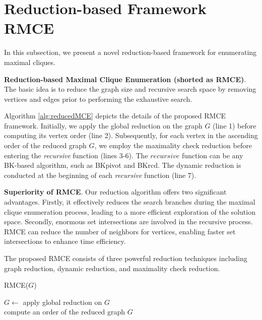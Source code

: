 \documentclass[sigconf, nonacm]{acmart}
\begin{document}
\section{Reduction-based Framework RMCE}\label{framework}

In this subsection, we present a novel reduction-based framework for enumerating maximal cliques. 

\noindent\textbf{Reduction-based Maximal Clique Enumeration (shorted as RMCE)}. The basic idea is to reduce the graph size and recursive search space by removing vertices and edges prior to performing the exhaustive search. 

Algorithm \ref{alg:reducedMCE} depicts the details of the proposed RMCE framework.  
Initially, we apply the global reduction on the graph $G$ (line 1)  before computing its vertex order (line 2). Subsequently, for each vertex in the ascending order of the reduced graph $G$, we employ the maximality check reduction before entering the \textit{recursive} function (lines 3-6). The $recursive$ function can be any BK-based algorithm, such as BKpivot and BKrcd. The dynamic reduction is conducted at the beginning of each \textit{recursive} function (line 7).


\noindent \textbf{Superiority of RMCE}. Our reduction algorithm offers two significant advantages. Firstly, it effectively reduces the search branches during the maximal clique enumeration process, leading to a more efficient exploration of the solution space. Secondly, enormous set intersections are involved in the recursive process. RMCE can reduce the number of neighbors for vertices, enabling faster set intersections to enhance time efficiency. 

The proposed RMCE consists of three powerful reduction techniques 
including graph reduction, dynamic reduction, and maximality check reduction. 


\begin{algorithm}[t]
    \SetNoFillComment
    \caption{RMCE($G$)}
    \label{alg:reducedMCE}
    \nl $G \gets$  apply global reduction on $G$ \\
    \nl compute an order of the reduced graph $G$ \\
    \nl {}
\end{algorithm}
\end{document}
